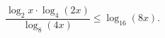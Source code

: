 \begin{ex}[type=inequality]
	\begin{condition}
		$\dfrac{\log_2 x\cdot\log_4(2x)}{\log_8(4x)}\leqslant\log_{16}(8x)  .$
	\end{condition}
\end{ex}